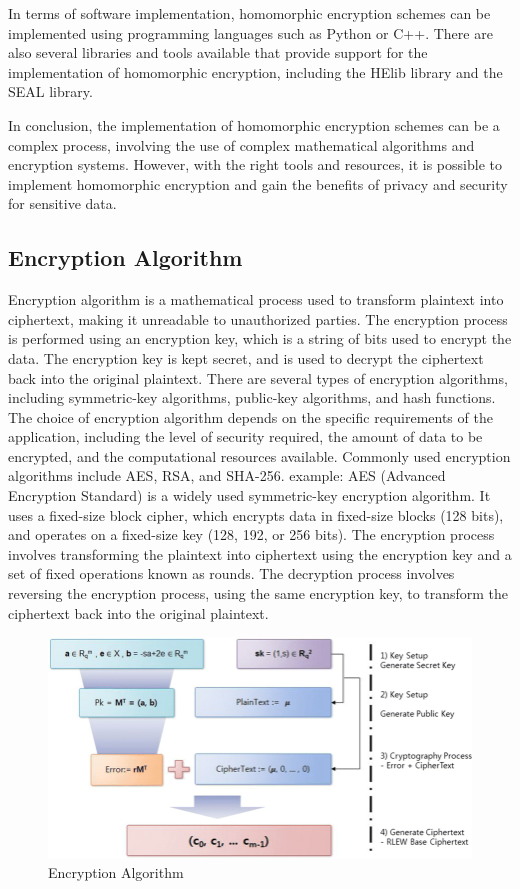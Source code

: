 \documentclass[conference]{IEEEtran}
\begin{document}
In terms of software implementation, homomorphic encryption schemes can be implemented using programming languages such as Python or C++. There are also several libraries and tools available that provide support for the implementation of homomorphic encryption, including the HElib library and the SEAL library.

In conclusion, the implementation of homomorphic encryption schemes can be a complex process, involving the use of complex mathematical algorithms and encryption systems. However, with the right tools and resources, it is possible to implement homomorphic encryption and gain the benefits of privacy and security for sensitive data.
\subsection{Encryption Algorithm}
Encryption algorithm is a mathematical process used to transform plaintext into ciphertext, making it unreadable to unauthorized parties. The encryption process is performed using an encryption key, which is a string of bits used to encrypt the data. The encryption key is kept secret, and is used to decrypt the ciphertext back into the original plaintext. There are several types of encryption algorithms, including symmetric-key algorithms, public-key algorithms, and hash functions. The choice of encryption algorithm depends on the specific requirements of the application, including the level of security required, the amount of data to be encrypted, and the computational resources available. Commonly used encryption algorithms include AES, RSA, and SHA-256.
example: AES (Advanced Encryption Standard) is a widely used symmetric-key encryption algorithm. It uses a fixed-size block cipher, which encrypts data in fixed-size blocks (128 bits), and operates on a fixed-size key (128, 192, or 256 bits). The encryption process involves transforming the plaintext into ciphertext using the encryption key and a set of fixed operations known as rounds. The decryption process involves reversing the encryption process, using the same encryption key, to transform the ciphertext back into the original plaintext.
\begin{figure}[h]
	\centering
	\includegraphics[width=1\linewidth]{algo.png}
	\caption{Encryption Algorithm}
	\label{fig:algo.png}
\end{figure}
\end{document}

